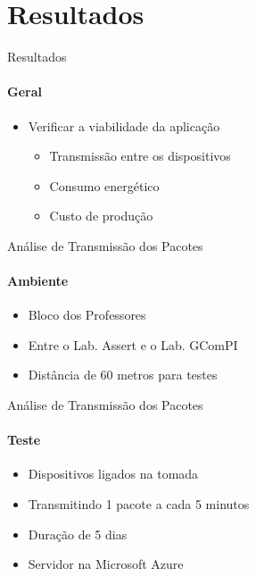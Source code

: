 \section{Resultados}
\begin{frame}{Resultados}
  \framesubtitle{\textcolor{fibeamer@black}{Geral}}
  \begin{itemize}
    \item Verificar a viabilidade da aplicação
    \begin{itemize}
      \item Transmissão entre os dispositivos
      \item Consumo energético
      \item Custo de produção
    \end{itemize}
  \end{itemize}
\end{frame}

\begin{frame}{Análise de Transmissão dos Pacotes}
  \framesubtitle{Ambiente}
  \begin{itemize}
    \item Bloco dos Professores
    \item Entre o Lab. Assert e o Lab. GComPI
    \item Distância de 60 metros para testes
  \end{itemize}
\end{frame}

\begin{frame}{Análise de Transmissão dos Pacotes}
  \framesubtitle{Teste}
  \begin{itemize}
    \item Dispositivos ligados na tomada
    \item Transmitindo 1 pacote a cada 5 minutos
    \item Duração de 5 dias
    \item Servidor na Microsoft Azure
  \end{itemize}
\end{frame}

